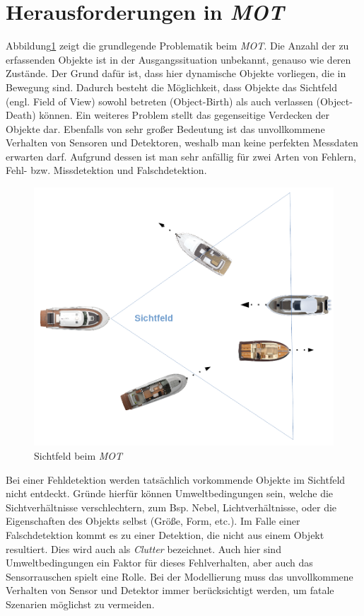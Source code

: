 \documentclass[10pt,a4paper]{article}
\begin{document}
\section{Herausforderungen in \textit{MOT}}
	Abbildung\ref{fig: Sichtfeld beim MOT} zeigt die grundlegende Problematik beim \textit{MOT}. Die Anzahl der zu erfassenden Objekte ist in der Ausgangssituation unbekannt, genauso wie deren Zustände. Der Grund dafür ist, dass hier dynamische Objekte vorliegen, die in Bewegung sind. Dadurch besteht die Möglichkeit, dass Objekte das Sichtfeld (engl. Field of View) sowohl betreten (Object-Birth) als auch verlassen (Object-Death) können. Ein weiteres Problem stellt das gegenseitige Verdecken der Objekte dar. Ebenfalls von sehr großer Bedeutung ist das unvollkommene Verhalten von Sensoren und Detektoren, weshalb man keine perfekten Messdaten erwarten darf. Aufgrund dessen ist man sehr anfällig für zwei Arten von Fehlern, Fehl- bzw. Missdetektion und Falschdetektion.
	\begin{figure}[h]
		\centering
		\includegraphics[width=0.5\linewidth]{./Pictures_report/Sichtfeld beim MOT.png}
		\caption{Sichtfeld beim \textit{MOT}}
		\label{fig: Sichtfeld beim MOT}
	\end{figure}
	\newline
	Bei einer Fehldetektion werden tatsächlich vorkommende Objekte im Sichtfeld nicht entdeckt. Gründe hierfür können Umweltbedingungen sein, welche die Sichtverhältnisse verschlechtern, zum Bsp. Nebel, Lichtverhältnisse, oder die Eigenschaften des Objekts selbst (Größe, Form, etc.). Im Falle einer Falschdetektion kommt es zu einer Detektion, die nicht aus einem Objekt resultiert. Dies wird auch als \textit{Clutter} bezeichnet. Auch hier sind Umweltbedingungen ein Faktor für dieses Fehlverhalten, aber auch das Sensorrauschen spielt eine Rolle. Bei der Modellierung muss das unvollkommene Verhalten von Sensor und Detektor immer berücksichtigt werden, um fatale Szenarien möglichst zu vermeiden.
	\newline
\end{document}
